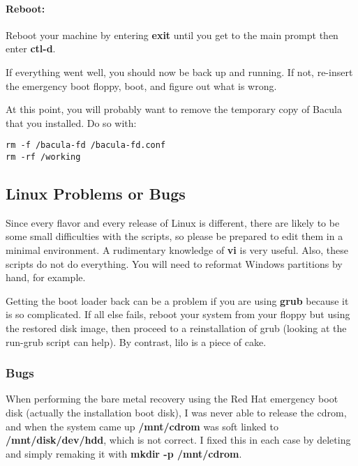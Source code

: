 \paragraph*{Reboot:}

Reboot your machine by entering {\bf exit} until you get to the main prompt
then enter {\bf ctl-d}. 

If everything went well, you should now be back up and running. If not,
re-insert the emergency boot floppy, boot, and figure out what is wrong. 

At this point, you will probably want to remove the temporary copy of Bacula
that you installed. Do so with: 

\footnotesize
\begin{verbatim}
rm -f /bacula-fd /bacula-fd.conf
rm -rf /working
\end{verbatim}
\normalsize

\label{FloppyProblems}

\subsection*{Linux Problems or Bugs}

Since every flavor and every release of Linux is different, there are likely
to be some small difficulties with the scripts, so please be prepared to edit
them in a minimal environment. A rudimentary knowledge of {\bf vi} is very
useful. Also, these scripts do not do everything. You will need to reformat
Windows partitions by hand, for example. 

Getting the boot loader back can be a problem if you are using {\bf grub}
because it is so complicated. If all else fails, reboot your system from your
floppy but using the restored disk image, then proceed to a reinstallation of
grub (looking at the run-grub script can help). By contrast, lilo is a piece
of cake. 

\subsubsection*{Bugs}

When performing the bare metal recovery using the Red Hat emergency boot disk
(actually the installation boot disk), I was never able to release the cdrom,
and when the system came up {\bf /mnt/cdrom} was soft linked to {\bf
/mnt/disk/dev/hdd}, which is not correct. I fixed this in each case by
deleting and simply remaking it with {\bf mkdir -p /mnt/cdrom}. 

